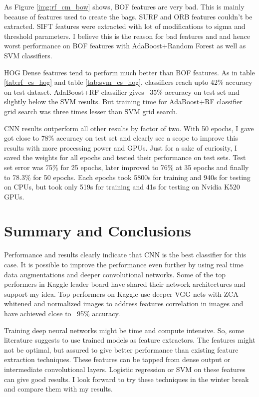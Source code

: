 \documentclass[12pt]{article}
\begin{document}
As Figure \ref{img:rf_cm_bow} shows, BOF features are very bad. This is mainly because of features used to create the bags. SURF and ORB features couldn't be extracted. SIFT features were extracted with lot of modifications to sigma and threshold parameters. I believe this is the reason for bad features and and hence worst performance on BOF features with AdaBoost+Random Forest as well as SVM classifiers.

HOG Dense features tend to perform much better than BOF features. As in table \ref{tab:rf_cs_hog} and table \ref{tab:svm_cs_hog}, classifiers reach upto 42\% accuracy on test dataset. AdaBoost+RF classifier gives ~35\% accuracy on test set and slightly below the SVM results. But training time for AdaBoost+RF classifier grid search was three times lesser than SVM grid search.

CNN results outperform all other results by factor of two. With 50 epochs, I gave got close to 78\% accuracy on test set and clearly see a scope to improve this results with more processing power and GPUs. Just for a sake of curiosity, I saved the weights for all epochs and tested their performance on test sets. Test set error was 75\% for 25 epochs, later improved to 76\% at 35 epochs and finally to 78.3\% for 50 epochs. Each epochs took 5800s for training and 940s for testing on CPUs, but took only 519s for training and 41s for testing on Nvidia K520 GPUs.





\section{Summary and Conclusions}
Performance and results clearly indicate that CNN is the best classifier for this case. It is possible to improve the performance even further by using real time data augmentations and deeper convolutional networks. Some of the top performers in Kaggle leader board have shared their network architectures and support my idea. Top performers on Kaggle use deeper VGG nets with ZCA whitened and normalized images to address features correlation in images and have achieved close to ~95\% accuracy. 

Training deep neural networks might be time and compute intensive. So, some literature suggests to use trained models as feature extractors. The features might not be optimal, but assured to give better performance than existing feature extraction techniques. These features can be tapped from dense output or intermediate convolutional layers. Logistic regression or SVM on these features can give good results. I look forward to try these techniques in the winter break and compare them with my results.
\end{document}
